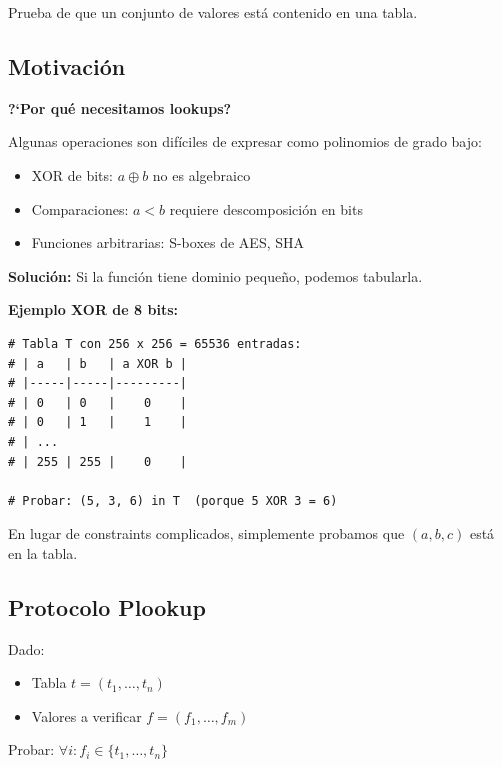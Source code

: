 \documentclass[11pt,a4paper,twoside]{book}
\begin{document}
\begin{definition}
Prueba de que un conjunto de valores est\'a contenido en una tabla.
\end{definition}

\subsection{Motivaci\'on}

\begin{intuicion}
\textbf{?`Por qu\'e necesitamos lookups?}

Algunas operaciones son dif\'iciles de expresar como polinomios de grado bajo:
\begin{itemize}
    \item XOR de bits: $a \oplus b$ no es algebraico
    \item Comparaciones: $a < b$ requiere descomposici\'on en bits
    \item Funciones arbitrarias: S-boxes de AES, SHA
\end{itemize}

\textbf{Soluci\'on:} Si la funci\'on tiene dominio peque\~no, podemos tabularla.

\textbf{Ejemplo XOR de 8 bits:}
\begin{lstlisting}[style=python]
# Tabla T con 256 x 256 = 65536 entradas:
# | a   | b   | a XOR b |
# |-----|-----|---------|
# | 0   | 0   |    0    |
# | 0   | 1   |    1    |
# | ...
# | 255 | 255 |    0    |

# Probar: (5, 3, 6) in T  (porque 5 XOR 3 = 6)
\end{lstlisting}

En lugar de constraints complicados, simplemente probamos que $(a, b, c)$ est\'a en la tabla.
\end{intuicion}

\subsection{Protocolo Plookup}

Dado:
\begin{itemize}
    \item Tabla $t = (t_1, \ldots, t_n)$
    \item Valores a verificar $f = (f_1, \ldots, f_m)$
\end{itemize}

Probar: $\forall i: f_i \in \{t_1, \ldots, t_n\}$
\end{document}
